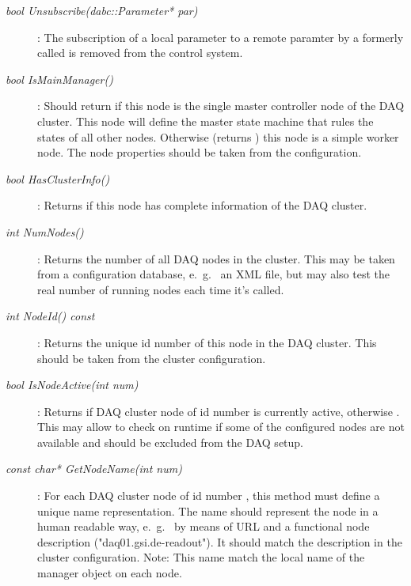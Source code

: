 \begin{description}
\item[\em bool Unsubscribe(dabc::Parameter* par)] :
The subscription of a local parameter  to a remote paramter by
a formerly called  is removed from the control system.


\item[\em bool IsMainManager()] :
Should return  if this node is the single 
master controller node of the DAQ cluster. This node will define
the master state machine that rules the states 
of all other nodes.
Otherwise (returns ) this node is a simple worker node.
The node properties should be taken from the configuration.

\item[\em bool HasClusterInfo()]:
Returns  if this node has complete information of the DAQ cluster.


\item[\em int NumNodes()] :
Returns the number of all DAQ nodes in the cluster. This may be taken
from a configuration database, e.~g.~ an XML file, but may also test the
real number of running nodes each time it's called.

\item[\em int NodeId() const] : 
Returns the unique id number of this node in the DAQ cluster.
This should be taken from the cluster configuration.

\item[\em bool IsNodeActive(int num)] : 
Returns  if DAQ cluster node of id number 
is currently active, otherwise . 
This may allow to check on runtime if some of the
configured nodes are not available and should be excluded from the
DAQ setup.

\item[\em const char* GetNodeName(int num)] :
For each DAQ cluster node of id number ,
this method must define a unique name representation. 
The name should represent the node in a human readable
way, e.~g.~ by means of URL and a functional node description
("daq01.gsi.de-readout"). It should match the
description in the cluster configuration.
Note: This name  match the local name
of the manager object on each node.




\end{description}
